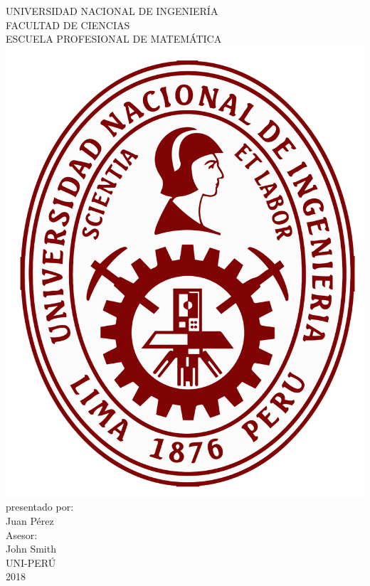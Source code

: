 \documentclass[12pt,a4paper]{report}
\numberwithin{equation}{section}
\begin{document}
\begin{titlepage}
\centering
\bfseries

	
{\Large UNIVERSIDAD NACIONAL DE INGENIERÍA\\[2mm]

FACULTAD DE CIENCIAS\\[3mm]

ESCUELA PROFESIONAL DE MATEMÁTICA}\\[5mm]


\includegraphics[scale=0.13]{uni}\\[10mm]	

presentado por:\\[1cm]

{\LARGE Juan Pérez}\\[5mm]

Asesor:\\[1cm]

{\Large John Smith}\\[1cm]

UNI-PERÚ\\[5mm]

2018
	
\end{titlepage}
\end{document}
